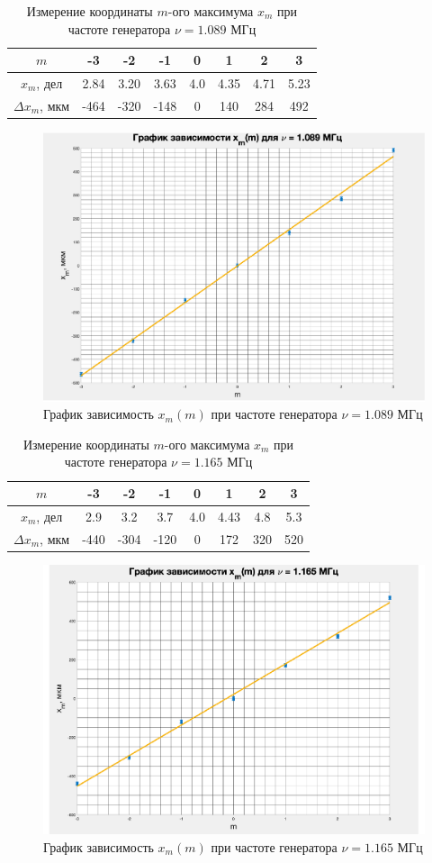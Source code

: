 \documentclass[a4paper,12pt]{article}
\begin{document}
\begin{table}[bhtp!]
	\centering
	
	\begin{tabular}{|c|c|c|c|c|c|c|c|}
		\hline
		$m$ &-3&-2&-1&0&1&2&3\\
		\hline
		$x_m$, дел&2.84&3.20&3.63&4.0&4.35&4.71&5.23\\
		\hline
		$\Delta x_m$, мкм&-464&-320&-148&0&140&284&492\\
		\hline
	\end{tabular}	
	\caption{Измерение координаты $ m $-ого максимума $ x_m $ при частоте генератора $ \nu = 1.089$ МГц}
	\label{tab:2}
\end{table}	
	
\begin{figure}[bhtp!]
	\centering
	\includegraphics[width=0.63\linewidth]{gr2.pdf}
	\caption{График зависимость $  x_m(m) $ при частоте генератора $ \nu = 1.089$ МГц}
	\label{gr2}
\end{figure}
	
\begin{table}[bhtp!]
	\centering
	
	\begin{tabular}{|c|c|c|c|c|c|c|c|}
		\hline
		$m$&-3&-2&-1&0&1&2&3\\
		\hline
		$x_m$, дел&2.9&3.2&3.7&4.0&4.43&4.8&5.3\\
		\hline
		$\Delta x_m$, мкм&-440&-304&-120&0&172&320&520\\
		\hline
	\end{tabular}
	
	\caption{Измерение координаты $ m $-ого максимума $ x_m $ при частоте генератора $ \nu =  1.165$ МГц}
	\label{tab:3}
\end{table}	
	
\begin{figure}[bhtp!]
	\centering
	\includegraphics[width=0.63\linewidth]{gr3.pdf}
	\caption{График зависимость $x_m(m) $ при частоте генератора $\nu = 1.165$ МГц}
	\label{gr3}
\end{figure}
	
\end{document}
